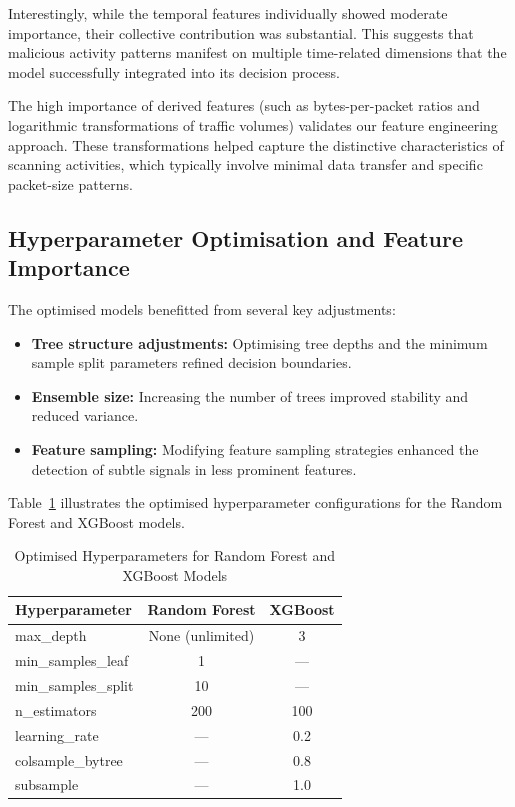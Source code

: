Interestingly, while the temporal features individually showed moderate importance, their collective contribution was substantial. This suggests that malicious activity patterns manifest on multiple time-related dimensions that the model successfully integrated into its decision process.

The high importance of derived features (such as bytes-per-packet ratios and logarithmic transformations of traffic volumes) validates our feature engineering approach. These transformations helped capture the distinctive characteristics of scanning activities, which typically involve minimal data transfer and specific packet-size patterns.

\subsection{Hyperparameter Optimisation and Feature Importance}

The optimised models benefitted from several key adjustments:
\begin{itemize}
    \item \textbf{Tree structure adjustments:} Optimising tree depths and the minimum sample split parameters refined decision boundaries.
    \item \textbf{Ensemble size:} Increasing the number of trees improved stability and reduced variance.
    \item \textbf{Feature sampling:} Modifying feature sampling strategies enhanced the detection of subtle signals in less prominent features.
\end{itemize}

Table~\ref{tab:optimized_hyperparameters} illustrates the optimised hyperparameter configurations for the Random Forest and XGBoost models.

\begin{table}[htbp]
\centering
\caption{Optimised Hyperparameters for Random Forest and XGBoost Models}
\label{tab:optimized_hyperparameters}
\begin{tabular}{lcc}
\hline
\textbf{Hyperparameter} & \textbf{Random Forest} & \textbf{XGBoost} \\
\hline
max\_depth                & None (unlimited)       & 3              \\
min\_samples\_leaf        & 1                      & ---            \\
min\_samples\_split       & 10                     & ---            \\
n\_estimators            & 200                    & 100            \\
learning\_rate           & ---                    & 0.2            \\
colsample\_bytree        & ---                    & 0.8            \\
subsample                & ---                    & 1.0            \\
\hline
\end{tabular}
\end{table}

